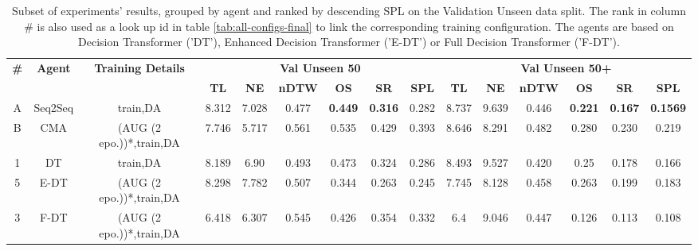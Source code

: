 \begin{table}
\centering
\caption{\label{tab:best_unseen_50}Subset of experiments' results, grouped by agent and ranked by descending SPL on the Validation Unseen data split. The rank in column \# is also used as a look up id in table \ref{tab:all-configs-final} to link the corresponding training configuration.     \newline The agents are based on Decision Transformer ('DT'), Enhanced Decision Transformer ('E-DT') or Full Decision Transformer ('F-DT').}
\begin{tabular}{@{\hskip3pt}c@{\hskip3pt}c@{\hskip3pt}c@{\hskip3pt}c@{\hskip3pt}c@{\hskip3pt}c@{\hskip3pt}c@{\hskip3pt}c@{\hskip3pt}c@{\hskip3pt}c@{\hskip3pt}c@{\hskip3pt}c@{\hskip3pt}c@{\hskip3pt}c@{\hskip3pt}c}
\toprule
\textbf{\#} & \textbf{Agent} & \textbf{Training Details} & \multicolumn{6}{c}{\textbf{Val Unseen 50}} & \multicolumn{6}{c}{\textbf{Val Unseen 50+}} \\
 \textbf{~} &     \textbf{~} &                \textbf{~} &       \textbf{TL} &    \textbf{NE} &   \textbf{nDTW} &     \textbf{OS} &    \textbf{SR} &    \textbf{SPL} &         \textbf{TL} &     \textbf{NE} &   \textbf{nDTW} &     \textbf{OS} &    \textbf{SR} &    \textbf{SPL} \\
          A &             Seq2Seq &                  train,DA &             8.312 &          7.028 &           0.477 &  \textbf{0.449} &  \textbf{0.316} &           0.282 &                8.737 &           9.639 &           0.446 &  \textbf{0.221} &  \textbf{0.167} &  \textbf{0.1569} \\
          B &           CMA &  (AUG (2 epo.))*,train,DA &             7.746 &          5.717 &           0.561 &           0.535 &          0.429 &           0.393 &               8.646 &           8.291 &           0.482 &           0.280 &          0.230 &           0.219 \\
\midrule
          1 &             DT &                  train,DA &             8.189 &          6.90 &           0.493 &  0.473 &  0.324 &           0.286 &                8.493 &           9.527 &          0.420 &  0.25 &  0.178 &  0.166 \\
          5 &           E-DT &  (AUG (2 epo.))*,train,DA &             8.298 &          7.782 &           0.507 &           0.344 &          0.263 &           0.245 &               7.745 &           8.128 &           0.458 &           0.263 &          0.199 &           0.183 \\
          3 &           F-DT &  (AUG (2 epo.))*,train,DA &              6.418 &  6.307 &  0.545 &           0.426 &          0.354 &  0.332 &                 6.4 &  9.046 &  0.447 &           0.126 &          0.113 &           0.108 \\
\bottomrule
\end{tabular}
\end{table}
